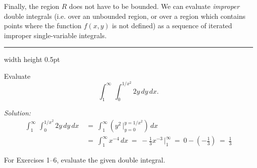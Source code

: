 Finally, the region $R$ does not have to be
bounded. We can evaluate \emph{improper} double integrals (i.e. over an unbounded region, or over a region which
contains points where the function $f(x,y)$ is not defined) as a sequence of iterated improper single-variable
integrals.

\medskip
\hrule width \textwidth height 0.5pt

\begin{exmp}
 Evaluate 
 \[\int_1^{\infty}\, \int_0^{1/{x^2}} 2y \,dy\,dx.\]
\par\noindent \emph{Solution:}
 \begin{align*}
  \int_1^{\infty} \,\int_0^{1/{x^2}} 2y \,dy\,dx ~&=~
   \int_1^{\infty} \left(y^2 \,\Big|_{y=0}^{y=1/{x^2}} \right) \,dx\\
   &=~ \int_1^{\infty} x^{-4}\,dx 
   ~=~ -\tfrac{1}{3} x^{-3} \,\Big|_{1}^{\infty} ~=~ 0 - (-\tfrac{1}{3}) ~=~ \tfrac{1}{3}
 \end{align*}
\end{exmp}
\startexercises\label{sec3dot2}
\par\noindent For Exercises 1--6, evaluate the given double integral.
